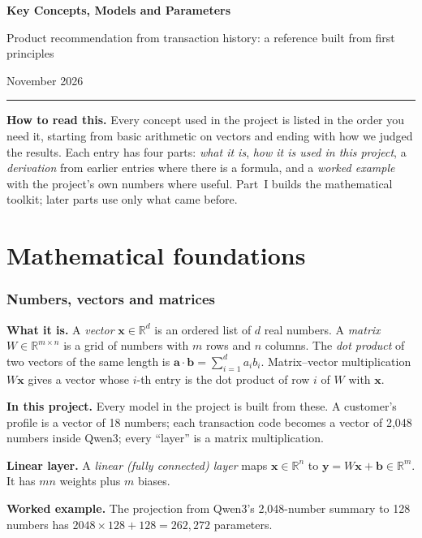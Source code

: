 \documentclass[10pt,a4paper]{article}
\newcommand{\what}[1]{\par\textbf{What it is.} #1}
\newcommand{\here}[1]{\par\textbf{In this project.} #1}
\newcommand{\ex}{\par\textbf{Worked example.} }
\begin{document}
{\bfseries\LARGE Key Concepts, Models and Parameters}\par
\vspace{2pt}
{\large Product recommendation from transaction history: a reference built from first principles}\par
\vspace{4pt}
November 2026
\vspace{6pt}\hrule\vspace{6pt}

\textbf{How to read this.} Every concept used in the project is listed in the order you need it, starting from basic arithmetic on vectors and ending with how we judged the results. Each entry has four parts: \emph{what it is}, \emph{how it is used in this project}, a \emph{derivation} from earlier entries where there is a formula, and a \emph{worked example} with the project's own numbers where useful. Part~I builds the mathematical toolkit; later parts use only what came before.

\tableofcontents

\part{Mathematical foundations}
\section{Numbers, vectors and matrices}
\what{A \emph{vector} $\mathbf{x}\in\mathbb{R}^d$ is an ordered list of $d$ real numbers. A \emph{matrix} $W\in\mathbb{R}^{m\times n}$ is a grid of numbers with $m$ rows and $n$ columns. The \emph{dot product} of two vectors of the same length is $\mathbf{a}\cdot\mathbf{b}=\sum_{i=1}^{d}a_ib_i$. Matrix--vector multiplication $W\mathbf{x}$ gives a vector whose $i$-th entry is the dot product of row $i$ of $W$ with $\mathbf{x}$.}
\here{Every model in the project is built from these. A customer's profile is a vector of 18 numbers; each transaction code becomes a vector of 2,048 numbers inside Qwen3; every ``layer'' is a matrix multiplication.}

\textbf{Linear layer.} A \emph{linear (fully connected) layer} maps $\mathbf{x}\in\mathbb{R}^{n}$ to $\mathbf{y}=W\mathbf{x}+\mathbf{b}\in\mathbb{R}^{m}$. It has $mn$ weights plus $m$ biases.
\ex The projection from Qwen3's 2,048-number summary to 128 numbers has $2048\times128+128=262{,}272$ parameters.
\end{document}

